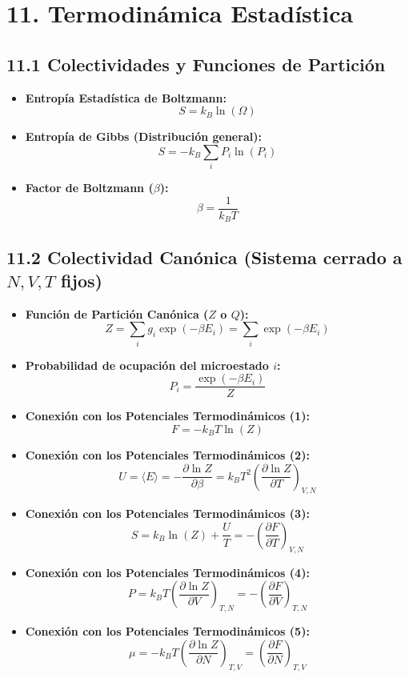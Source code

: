\documentclass[11pt,a4paper]{article}
\begin{document}
\section*{11. Termodinámica Estadística}

\subsection*{11.1 Colectividades y Funciones de Partición}

\begin{itemize}
  \item \textbf{Entropía Estadística de Boltzmann:}
  \[
    S = k_B \ln(\Omega)
  \]
  \item \textbf{Entropía de Gibbs (Distribución general):}
  \[
    S = -k_B \sum_i P_i \ln(P_i)
  \]
  \item \textbf{Factor de Boltzmann ($\beta$):}
  \[
    \beta = \frac{1}{k_B T}
  \]
\end{itemize}

\subsection*{11.2 Colectividad Canónica (Sistema cerrado a $N, V, T$ fijos)}

\begin{itemize}
  \item \textbf{Función de Partición Canónica ($Z$ o $Q$):}
  \[
    Z = \sum_i g_i \exp(-\beta E_i) = \sum_i \exp(-\beta E_i)
  \]
  \item \textbf{Probabilidad de ocupación del microestado $i$:}
  \[
    P_i = \frac{\exp(-\beta E_i)}{Z}
  \]
  \item \textbf{Conexión con los Potenciales Termodinámicos (1):}
  \[
    F = -k_B T \ln(Z)
  \]
  \item \textbf{Conexión con los Potenciales Termodinámicos (2):}
  \[
    U = \langle E \rangle = -\frac{\partial \ln Z}{\partial \beta} = k_B T^2 \left( \frac{\partial \ln Z}{\partial T} \right)_{V, N}
  \]
  \item \textbf{Conexión con los Potenciales Termodinámicos (3):}
  \[
    S = k_B \ln(Z) + \frac{U}{T} = -\left( \frac{\partial F}{\partial T} \right)_{V, N}
  \]
  \item \textbf{Conexión con los Potenciales Termodinámicos (4):}
  \[
    P = k_B T \left( \frac{\partial \ln Z}{\partial V} \right)_{T, N} = -\left( \frac{\partial F}{\partial V} \right)_{T, N}
  \]
  \item \textbf{Conexión con los Potenciales Termodinámicos (5):}
  \[
    \mu = -k_B T \left( \frac{\partial \ln Z}{\partial N} \right)_{T, V} = \left( \frac{\partial F}{\partial N} \right)_{T, V}
  \]
\end{itemize}
\end{document}
